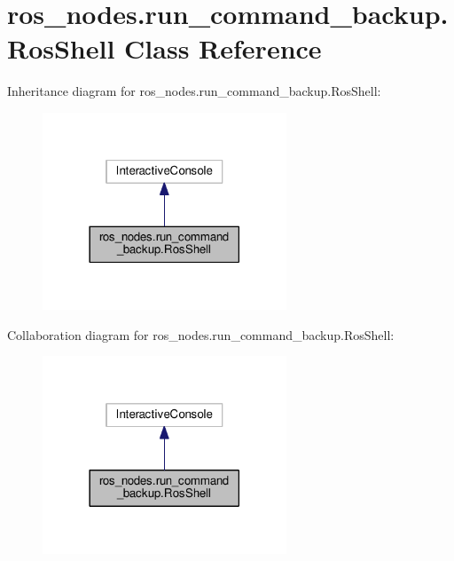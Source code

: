 \hypertarget{classros__nodes_1_1run__command__backup_1_1RosShell}{}\section{ros\+\_\+nodes.\+run\+\_\+command\+\_\+backup.\+Ros\+Shell Class Reference}
\label{classros__nodes_1_1run__command__backup_1_1RosShell}


Inheritance diagram for ros\+\_\+nodes.\+run\+\_\+command\+\_\+backup.\+Ros\+Shell\+:
\nopagebreak
\begin{figure}[H]
\begin{center}
\leavevmode
\includegraphics[width=206pt]{classros__nodes_1_1run__command__backup_1_1RosShell__inherit__graph}
\end{center}
\end{figure}


Collaboration diagram for ros\+\_\+nodes.\+run\+\_\+command\+\_\+backup.\+Ros\+Shell\+:
\nopagebreak
\begin{figure}[H]
\begin{center}
\leavevmode
\includegraphics[width=206pt]{classros__nodes_1_1run__command__backup_1_1RosShell__coll__graph}
\end{center}
\end{figure}
